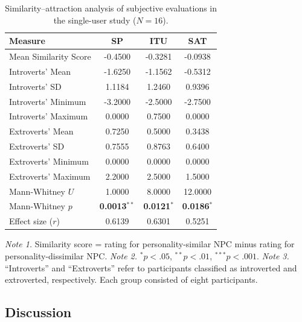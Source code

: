 \documentclass[a4paper,fleqn]{cas-sc}
\begin{document}
\begin{table}[htbp]
\centering
\caption{Similarity--attraction analysis of subjective evaluations in the single-user study ($N=16$).}
\label{tab:attraction_test}
\begin{tabular}{lccc}
\toprule
\textbf{Measure} & \textbf{SP} & \textbf{ITU} & \textbf{SAT} \\
\midrule
Mean Similarity Score      & -0.4500 & -0.3281 & -0.0938 \\
Introverts' Mean           & -1.6250 & -1.1562 & -0.5312 \\
Introverts' SD             & 1.1184  & 1.2460  & 0.9396  \\
Introverts' Minimum        & -3.2000 & -2.5000 & -2.7500 \\
Introverts' Maximum        & 0.0000  & 0.7500  & 0.0000  \\
Extroverts' Mean           & 0.7250  & 0.5000  & 0.3438  \\
Extroverts' SD             & 0.7555  & 0.8763  & 0.6400  \\
Extroverts' Minimum        & 0.0000  & 0.0000  & 0.0000  \\
Extroverts' Maximum        & 2.2000  & 2.5000  & 1.5000  \\
\midrule
Mann-Whitney $U$          & 1.0000  & 8.0000  & 12.0000 \\
Mann-Whitney $p$          & \textbf{0.0013}$^{**}$
                           & \textbf{0.0121}$^{*}$
                           & \textbf{0.0186}$^{*}$ \\
Effect size ($r$)          & 0.6139  & 0.6301  & 0.5251  \\
\bottomrule
\end{tabular}

\vspace{2mm}
\begin{minipage}{0.95\linewidth}
\footnotesize
\textit{Note 1.} Similarity score = rating for personality-similar NPC minus rating for personality-dissimilar NPC.
\textit{Note 2.} $^{*}p < .05$, $^{**}p < .01$, $^{***}p < .001$.
\textit{Note 3.} ``Introverts'' and ``Extroverts'' refer to participants classified as introverted and extroverted, respectively. Each group consisted of eight participants.
\end{minipage}
\end{table}

\subsection{Discussion}
\end{document}
